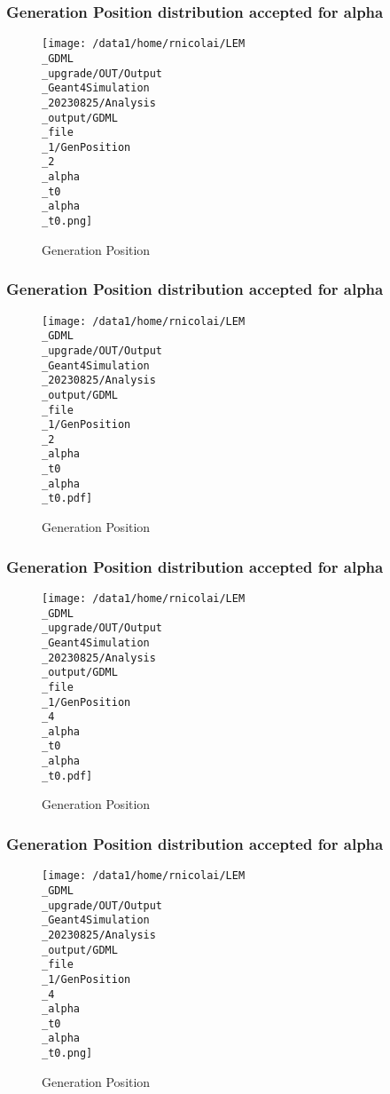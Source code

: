\documentclass[8pt]{beamer}
\begin{document}
            \begin{frame}
                \frametitle{Generation Position distribution accepted for alpha}
            
        \begin{figure}[h]
            \centering
            \texttt{[image: /data1/home/rnicolai/LEM\\\_GDML\\\_upgrade/OUT/Output\\\_Geant4Simulation\\\_20230825/Analysis\\\_output/GDML\\\_file\\\_1/GenPosition\\\_2\\\_alpha\\\_t0\\\_alpha\\\_t0.png]}
            \caption{Generation Position}
        \end{figure}
        
            \end{frame}
            
            \begin{frame}
                \frametitle{Generation Position distribution accepted for alpha}
            
        \begin{figure}[h]
            \centering
            \texttt{[image: /data1/home/rnicolai/LEM\\\_GDML\\\_upgrade/OUT/Output\\\_Geant4Simulation\\\_20230825/Analysis\\\_output/GDML\\\_file\\\_1/GenPosition\\\_2\\\_alpha\\\_t0\\\_alpha\\\_t0.pdf]}
            \caption{Generation Position}
        \end{figure}
        
            \end{frame}
            
            \begin{frame}
                \frametitle{Generation Position distribution accepted for alpha}
            
        \begin{figure}[h]
            \centering
            \texttt{[image: /data1/home/rnicolai/LEM\\\_GDML\\\_upgrade/OUT/Output\\\_Geant4Simulation\\\_20230825/Analysis\\\_output/GDML\\\_file\\\_1/GenPosition\\\_4\\\_alpha\\\_t0\\\_alpha\\\_t0.pdf]}
            \caption{Generation Position}
        \end{figure}
        
            \end{frame}
            
            \begin{frame}
                \frametitle{Generation Position distribution accepted for alpha}
            
        \begin{figure}[h]
            \centering
            \texttt{[image: /data1/home/rnicolai/LEM\\\_GDML\\\_upgrade/OUT/Output\\\_Geant4Simulation\\\_20230825/Analysis\\\_output/GDML\\\_file\\\_1/GenPosition\\\_4\\\_alpha\\\_t0\\\_alpha\\\_t0.png]}
            \caption{Generation Position}
        \end{figure}
        
            \end{frame}
            
\end{document}
